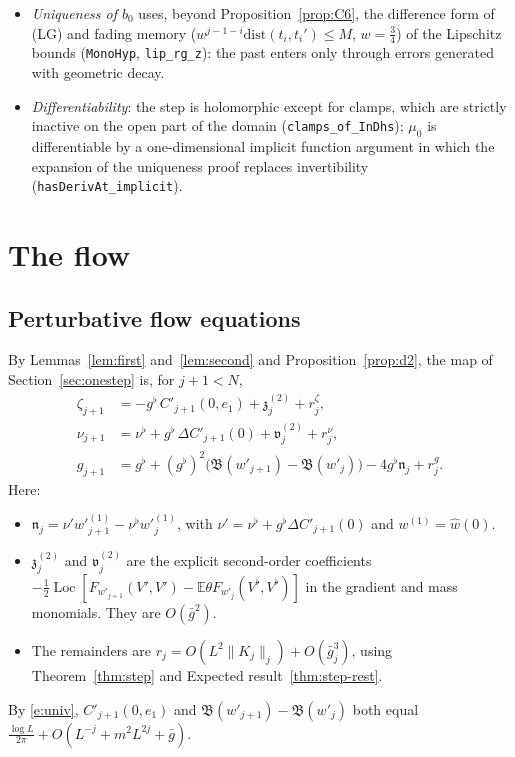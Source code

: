 \documentclass[11pt]{amsart}
\theoremstyle{definition}
\theoremstyle{remark}
\numberwithin{equation}{section}
\newcommand{\E}{\mathbb{E}}
\newcommand{\Loc}{\operatorname{Loc}}
\begin{document}
\begin{itemize}
\begin{itemize}
    $L>2^{d+4}+4$ (\texttt{region\_small\_L}), giving \texttt{Last.rg\_step\_bounds} under \texttt{ValidAtL}.
    The step $j=N-1$ is \texttt{LastN.rg\_last\_bounds} (Section~\ref{sec:corr}). The bound on $\check g_{N-1}$
    comes from the $g$-component of \texttt{Last.rawStep\_coup} (\texttt{g\_step\_bounds}).
  \item \emph{Uniqueness of $b_0$} uses, beyond Proposition~\ref{prop:C6}, the difference form of (LG) and fading
    memory ($w^{j-1-i}\mathrm{dist}(t_i,t_i')\le M$, $w=\frac34$) of the Lipschitz bounds (\texttt{MonoHyp},
    \texttt{lip\_rg\_z}): the past enters only through errors generated with geometric decay.
  \item \emph{Differentiability}: the step is holomorphic except for clamps, which are strictly inactive on the
    open part of the domain (\texttt{clamps\_of\_InDhs}); $\mu_0$ is differentiable by a one-dimensional implicit
    function argument in which the expansion of the uniqueness proof replaces invertibility
    (\texttt{hasDerivAt\_implicit}).
  \end{itemize}
\end{itemize}

\section{The flow}
\label{sec:flow}

\subsection{Perturbative flow equations}
\label{sec:pt-flow}
By Lemmas~\ref{lem:first} and~\ref{lem:second} and Proposition~\ref{prop:d2}, the map of Section~\ref{sec:onestep} is,
for $j+1<N$,
\begin{align}
  \zeta_{j+1}&=-g^\flat\,C'_{j+1}(0,e_1)+\mathfrak z^{(2)}_j+r^\zeta_j,\label{e:zflow}\\
  \nu_{j+1}&=\nu^\flat+g^\flat\,\Delta C'_{j+1}(0)+\mathfrak v^{(2)}_j+r^\nu_j,\label{e:nuflow}\\
  g_{j+1}&=g^\flat+(g^\flat)^2\bigl(\mathfrak B(w'_{j+1})-\mathfrak B(w'_j)\bigr)-4g^\flat\mathfrak n_j+r^g_j.\label{e:gflow}
\end{align}
Here:
\begin{itemize}
\item $\mathfrak n_j=\nu' w'^{(1)}_{j+1}-\nu^\flat w'^{(1)}_j$, with $\nu'=\nu^\flat+g^\flat\Delta C'_{j+1}(0)$
  and $w^{(1)}=\hat w(0)$.
\item $\mathfrak z^{(2)}_j$ and $\mathfrak v^{(2)}_j$ are the explicit second-order coefficients
  $-\frac12\Loc[F_{w'_{j+1}}(V',V')-\E\theta F_{w'_j}(V^\flat,V^\flat)]$ in the gradient and mass
  monomials. They are $O(\bar g^2)$.
\item The remainders are $r_j=O(L^2\|K_j\|_j)+O(\bar g_j^3)$, using Theorem~\ref{thm:step}
  and Expected result~\ref{thm:step-rest}.
\end{itemize}
By \eqref{e:univ}, $C'_{j+1}(0,e_1)$ and $\mathfrak B(w'_{j+1})-\mathfrak B(w'_j)$ both equal
$\frac{\log L}{2\pi}+O(L^{-j}+m^2L^{2j}+\bar g)$.
\end{document}
